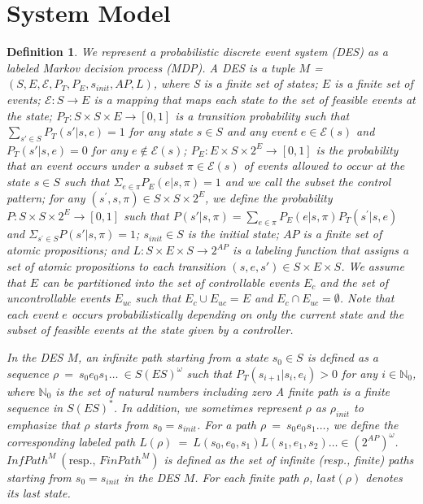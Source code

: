 \documentclass[letterpaper, 10 pt, conference]{ieeeconf}
\newtheorem{definition}{Definition}
\begin{document}
\section{System Model}

\begin{definition}
We represent a probabilistic discrete event system (DES) as a labeled Markov decision process (MDP). A DES is a tuple $M$ = $(S, E, \mathcal{E}, P_T, P_E, s_{init}, AP, L)$, where S is a finite set of states; $E$ is a finite set of events; $\mathcal{E} : S \rightarrow E$ is a mapping that maps each state to the set of feasible events at the state; $P_T:S \times S \times E \rightarrow [0,1]$ is a transition probability such that $\sum_{s' \in S} P_T(s'|s,e) = 1$ for any state $s \in S$ and any event $e \in \mathcal{E}(s) $ and $P_T(s'|s,e) = 0$ for any $e \notin \mathcal{E}(s)$; $P_E : E \times S \times 2^E \rightarrow [0,1]$ is the probability that an event occurs under a subset $\pi \in \mathcal{E}(s)$ of events allowed to occur at the state $s \in S$ such that $\Sigma_{e \in \pi} P_E(e|s,\pi) = 1$ and we call the subset the control pattern; for any $(s^{\prime}, s, \pi) \in S \times S \times 2^E$, we define the probability $P : S \times S \times 2^{E} \rightarrow [0,1]$ such that $P(s'|s,\pi) = \sum_{e \in \pi}P_E(e|s,\pi) P_T(s^{\prime}|s,e)$ and $\Sigma_{s^{\prime} \in S} P(s'|s,\pi) = 1$; $s_{init} \in S$ is the initial state; $AP$ is a finite set of atomic propositions; and $L : S \times E \times S \rightarrow 2^{AP}$ is a labeling function that assigns a set of atomic propositions to each transition $(s, e, s') \in S \times E \times S$. We assume that $E$ can be partitioned into the set of controllable events $E_c$ and the set of uncontrollable events $E_{uc}$ such that $E_c \cup E_{uc} = E$ and $E_c \cap E_{uc} = \emptyset$. Note that each event $e$ occurs probabilistically depending on only the current state and the subset of feasible events at the state given by a controller.

In the DES $M$, an infinite path starting from a state $s_0 \in S$ is defined as a sequence $\rho\ =\ s_0e_0s_1 \ldots\ \in S (E S)^{\omega}$ such that $P_T(s_{i+1}|s_i, e_i) > 0$ for any $ i \in \mathbb{N}_0$, where $\mathbb{N}_0$ is the set of natural numbers including zero A finite path is a finite sequence in $S (E S)^*$. In addition, we sometimes represent $\rho$ as $\rho_{init}$ to emphasize that $\rho$ starts from $s_0 = s_{init}$.
For a path $\rho\ =\ s_0e_0s_1 \ldots$, we define the corresponding labeled path $L(\rho)\ =\ L(s_0,e_0,s_1)L(s_1,e_1,s_2) \ldots \in (2^{AP})^{\omega}$.
 $InfPath^{M}\ ( \text{resp., }FinPath^{M})$ is defined as the set of infinite (resp., finite) paths starting from $s_0=s_{init}$ in the DES $M$. For each finite path $\rho$, $last(\rho)$ denotes its last state.
\end{definition}
\end{document}
